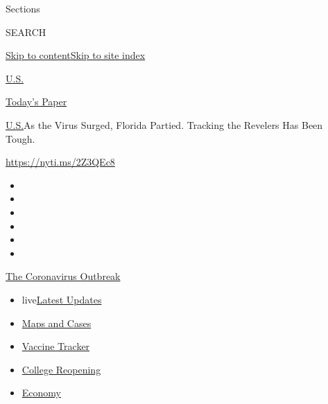 Sections

SEARCH

\protect\hyperlink{site-content}{Skip to
content}\protect\hyperlink{site-index}{Skip to site index}

\href{https://www.nytimes.com/section/us}{U.S.}

\href{https://myaccount.nytimes.com/auth/login?response_type=cookie\&client_id=vi}{}

\href{https://www.nytimes.com/section/todayspaper}{Today's Paper}

\href{/section/us}{U.S.}\textbar{}As the Virus Surged, Florida Partied.
Tracking the Revelers Has Been Tough.

\url{https://nyti.ms/2Z3QEc8}

\begin{itemize}
\item
\item
\item
\item
\item
\item
\end{itemize}

\href{https://www.nytimes.com/news-event/coronavirus?action=click\&pgtype=Article\&state=default\&region=TOP_BANNER\&context=storylines_menu}{The
Coronavirus Outbreak}

\begin{itemize}
\tightlist
\item
  live\href{https://www.nytimes.com/2020/08/04/world/coronavirus-cases.html?action=click\&pgtype=Article\&state=default\&region=TOP_BANNER\&context=storylines_menu}{Latest
  Updates}
\item
  \href{https://www.nytimes.com/interactive/2020/us/coronavirus-us-cases.html?action=click\&pgtype=Article\&state=default\&region=TOP_BANNER\&context=storylines_menu}{Maps
  and Cases}
\item
  \href{https://www.nytimes.com/interactive/2020/science/coronavirus-vaccine-tracker.html?action=click\&pgtype=Article\&state=default\&region=TOP_BANNER\&context=storylines_menu}{Vaccine
  Tracker}
\item
  \href{https://www.nytimes.com/2020/08/02/us/covid-college-reopening.html?action=click\&pgtype=Article\&state=default\&region=TOP_BANNER\&context=storylines_menu}{College
  Reopening}
\item
  \href{https://www.nytimes.com/live/2020/08/04/business/stock-market-today-coronavirus?action=click\&pgtype=Article\&state=default\&region=TOP_BANNER\&context=storylines_menu}{Economy}
\end{itemize}

